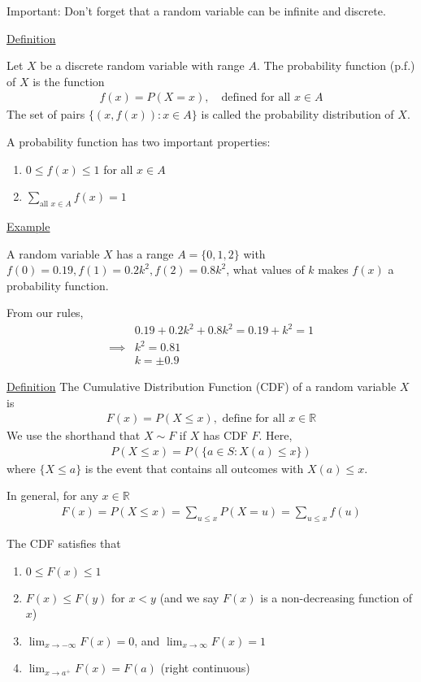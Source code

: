 \documentclass{article}
\begin{document}
Important: Don't forget that a random variable can be infinite and discrete.

\underline{Definition}

Let $X$ be a discrete random variable with range $A$. The probability function (p.f.) of $X$ is the function
\begin{align*}
    f(x) = P(X=x), \quad \text{defined for all } x \in A
\end{align*}
The set of pairs $\{(x,f(x)):x \in A\}$ is called the probability distribution of $X$.

A probability function has two important properties:
\begin{enumerate}
    \item $0 \le f(x) \le 1$ for all $x \in A$
    \item $\sum_{\text{all } x \in A}f(x) = 1$
\end{enumerate}

\underline{Example}

A random variable $X$ has a range $A = \{0,1,2\}$ with $f(0) = 0.19, f(1) = 0.2k^2, f(2) = 0.8k^2$, what values of $k$ makes $f(x)$ a probability function.

From our rules,
\begin{align*}
    &0.19 + 0.2k^2 + 0.8k^2 = 0.19 + k^2 = 1 \\
    \implies &k^2 = 0.81 \\
    &k = \pm 0.9
\end{align*}

\underline{Definition}
The Cumulative Distribution Function (CDF) of a random variable $X$ is
\begin{align*}
    F(x) = P(X \le x), \text{ define for all } x \in \mathbb{R}
\end{align*}
We use the shorthand that $X \sim F$ if $X$ has CDF $F$. Here,
\begin{align*}
    P(X \le x) = P(\{a \in S: X(a) \le x\})
\end{align*}
where $\{X \le a\}$ is the event that contains all outcomes with $X(a) \le x$.

In general, for any $x \in \mathbb{R}$
\begin{align*}
    F(x) = P(X \le x) = \sum_{u \le x}P(X = u) = \sum_{u \le x}f(u)
\end{align*}

The CDF satisfies that
\begin{enumerate}
    \item $0 \le F(x) \le 1$
    \item $F(x) \le F(y)$ for $x < y$ (and we say $F(x)$ is a non-decreasing function of $x$)
    \item $\lim_{x \to -\infty}F(x) = 0$, and $\lim_{x\to\infty}F(x) = 1$
    \item $\lim_{x \to a^+}F(x) = F(a)$ (right continuous)
\end{enumerate}
\end{document}
